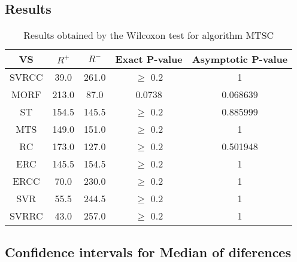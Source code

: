 \documentclass[a4paper,10pt]{article}
\begin{document}
\subsection{Results}

\begin{table}[!htp]
\centering\small
\begin{tabular}{
|c|c|c|c|c|}
\hline
 VS & $R^{+}$ & $R^{-}$ & Exact P-value & Asymptotic P-value \\ \hline 
SVRCC & 39.0 & 261.0 & $\geq$ 0.2 & 1\\ \hline 
MORF & 213.0 & 87.0 & 0.0738 & 0.068639\\ \hline 
ST & 154.5 & 145.5 & $\geq$ 0.2 & 0.885999\\ \hline 
MTS & 149.0 & 151.0 & $\geq$ 0.2 & 1\\ \hline 
RC & 173.0 & 127.0 & $\geq$ 0.2 & 0.501948\\ \hline 
ERC & 145.5 & 154.5 & $\geq$ 0.2 & 1\\ \hline 
ERCC & 70.0 & 230.0 & $\geq$ 0.2 & 1\\ \hline 
SVR & 55.5 & 244.5 & $\geq$ 0.2 & 1\\ \hline 
SVRRC & 43.0 & 257.0 & $\geq$ 0.2 & 1\\ \hline 

\end{tabular}
\caption{Results obtained by the Wilcoxon test for algorithm MTSC}
\end{table}

\subsection{Confidence intervals for Median of diferences}
\end{document}
